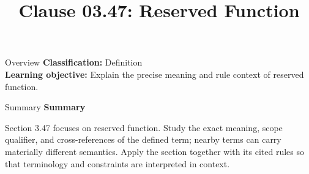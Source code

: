 \documentclass[10pt,letterpaper]{article}
\title{Clause 03.47: Reserved Function}
\author{}
\date{}
\begin{document}
\maketitle
\begin{CornellOverviewBox}{Overview}
\textbf{Classification:} Definition\\[2pt]
\textbf{Learning objective:} Explain the precise meaning and rule context of reserved function.
\end{CornellOverviewBox}\begin{CornellSummaryBox}{Summary}
{\sffamily\bfseries\color{Accent} Summary}\par\vspace{3pt}Section 3.47 focuses on reserved function. Study the exact meaning, scope qualifier, and cross-references of the defined term; nearby terms can carry materially different semantics. Apply the section together with its cited rules so that terminology and constraints are interpreted in context.
\end{CornellSummaryBox}
\end{document}
